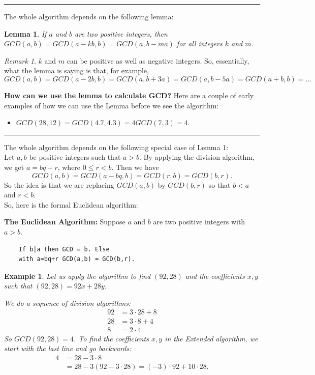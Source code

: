 \documentclass[12pt]{article}
\theoremstyle{plain}
\newtheorem{lemma}{Lemma}
\newtheorem{example}{Example}
\theoremstyle{definition}
\theoremstyle{remark}
\newtheorem{remark}{Remark}
\begin{document}
\hrule

\bigskip
\noindent
The whole algorithm depends on the following lemma:
\begin{lemma}
If $a$ and $b$ are two positive integers, then $GCD(a,b)=GCD(a-kb,b) = GCD(a, b-ma)$ for all integers $k$ and $m$.
\end{lemma} 
\begin{remark}
$k$ and $m$ can be positive as well as negative integers. So, essentially, what the lemma is saying is that, for example,  
$$GCD(a,b) = GCD(a-2b, b) = GCD(a, b+3a)=GCD(a,b-5a)  = GCD(a+b,b) = \dots $$
\end{remark}

\bigskip
\noindent
{\bf How can we use the lemma to calculate GCD?}
Here are a couple of early examples of how we can use the Lemma before we see the algorithm:
\begin{itemize}
    \item $GCD(28,12) =GCD(4.7,4.3)=4GCD(7,3)=4.$
\end{itemize}

\bigskip
\hrule

\bigskip
\noindent The whole algorithm depends on the following special case of Lemma 1: \\
Let $a, b$ be positive integers such that $a>b$. By applying the division algorithm, we get $a=bq+r$, where $0\leq r<b$. Then we have 
$$GCD(a,b) = GCD(a-bq, b) = GCD(r,b) = GCD(b,r).$$
So the idea is that we are replacing $GCD(a,b)$ by $GCD(b,r)$ so that $b<a$ and $r<b$. \\
So, here is the formal Euclidean algorithm:

\bigskip
\noindent
{\bf The Euclidean Algorithm:} Suppose $a$ and $b$ are two positive integers with $a>b$. 
\begin{verbatim}
    If b|a then GCD = b. Else 
    with a=bq+r GCD(a,b) = GCD(b,r).
\end{verbatim} 

\begin{example}
Let us apply the algorithm to find $(92,28)$ and the coefficients $x,y$ such that $(92,28)=92x+28y$. 

We do a sequence of division algorithms:
\begin{align*}
    92&=3\cdot 28+8 \\
    28&=3\cdot 8+4\\
    8&=2\cdot 4.
\end{align*}
So $GCD(92,28)=4$. To find the coefficients $x, y$ in the Extended algorithm, we start with the last line and go backwards: 
\begin{align*}
    4 & = 28-3\cdot 8 \\
     & = 28-3(92-3\cdot 28) = (-3)\cdot 92+10\cdot 28. 
\end{align*}
\end{example}
\end{document}
